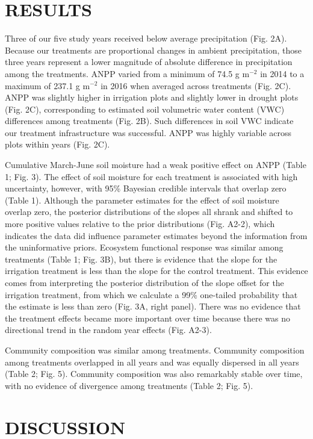 \documentclass[fleqn,10pt,lineno]{wlpeerj} %
\begin{document}
\section{RESULTS}\label{results}

Three of our five study years received below average precipitation (Fig.
2A). Because our treatments are proportional changes in ambient
precipitation, those three years represent a lower magnitude of absolute
difference in precipitation among the treatments. ANPP varied from a
minimum of 74.5 g m\(^{-2}\) in 2014 to a maximum of 237.1 g m\(^{-2}\)
in 2016 when averaged across treatments (Fig. 2C). ANPP was slightly
higher in irrigation plots and slightly lower in drought plots (Fig.
2C), corresponding to estimated soil volumetric water content (VWC)
differences among treatments (Fig. 2B). Such differences in soil VWC
indicate our treatment infrastructure was successful. ANPP was highly
variable across plots within years (Fig. 2C).

Cumulative March-June soil moisture had a weak positive effect on ANPP
(Table 1; Fig. 3). The effect of soil moisture for each treatment is
associated with high uncertainty, however, with 95\% Bayesian credible
intervals that overlap zero (Table 1). Although the parameter estimates
for the effect of soil moisture overlap zero, the posterior
distributions of the slopes all shrank and shifted to more positive
values relative to the prior distributions (Fig. A2-2), which indicates
the data did influence parameter estimates beyond the information from
the uninformative priors. Ecosystem functional response was similar
among treatments (Table 1; Fig. 3B), but there is evidence that the
slope for the irrigation treatment is less than the slope for the
control treatment. This evidence comes from interpreting the posterior
distribution of the slope offset for the irrigation treatment, from
which we calculate a 99\% one-tailed probability that the estimate is
less than zero (Fig. 3A, right panel). There was no evidence that the
treatment effects became more important over time because there was no
directional trend in the random year effects (Fig. A2-3).

Community composition was similar among treatments. Community
composition among treatments overlapped in all years and was equally
dispersed in all years (Table 2; Fig. 5). Community composition was also
remarkably stable over time, with no evidence of divergence among
treatments (Table 2; Fig. 5).

\section{DISCUSSION}\label{discussion}
\end{document}
